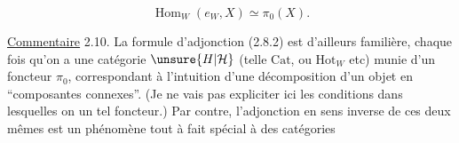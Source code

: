 \[
 \boxed{\operatorname{Hom}_W(e_W,X)\simeq\pi_0(X)}. \tag*{(2.8.4)}
\]

\uline{Commentaire} 2.10. La formule d'adjonction (2.8.2) est d'ailleurs familière, chaque fois qu'on a une catégorie $\unsure{H|\mathcal{H}}$ (telle $\mathrm{Cat}$, ou $\mathrm{Hot}_W$ etc) munie d'un foncteur $\pi_0$,  correspondant à l'intuition d'une décomposition d'un objet en ``composantes connexes''. (Je ne vais pas expliciter ici les conditions  dans lesquelles on  un tel foncteur.) Par contre, l'adjonction en sens inverse de ces deux mêmes  est un phénomène tout à fait spécial à des catégories


